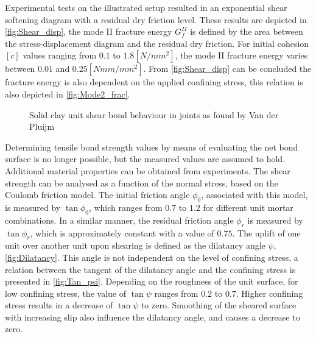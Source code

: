 Experimental tests on the illustrated setup resulted in an exponential shear softening diagram with a residual dry friction level. These results are depicted in \autoref{fig:Shear_disp}, the mode II fracture energy $G^{II}_{f}$ is defined by the area between the stress-displacement diagram and the residual dry friction. For initial cohesion $[c]$ values ranging from $0.1$ to $1.8 [N/mm^2]$, the mode II fracture energy varies between $0.01$ and $0.25 [Nmm/mm^2]$. From \autoref{fig:Shear_disp} can be concluded the fracture energy is also dependent on the applied confining stress, this relation is also depicted in \autoref{fig:Mode2_frac}.

\begin{figure}[!htb]
    \centering
     \hspace{3em}
    \caption{Solid clay unit shear bond behaviour in joints as found by Van der Pluijm \cite{pluijm1993, lourenco1996}}
    \label{fig:Shearbehave}
\end{figure}

Determining tensile bond strength values by means of evaluating the net bond surface is no longer possible, but the measured values are assumed to hold. Additional material properties can be obtained from experiments. The shear strength can be analysed as a function of the normal stress, based on the Coulomb friction model. The initial friction angle $\phi_0$, associated with this model, is measured by $\tan\phi_0$, which ranges from $0.7$ to $1.2$ for different unit mortar combinations. In a similar manner, the residual friction angle $\phi_r$ is measured by $\tan\phi_r$, which is approximately constant with a value of $0.75$. The uplift of one unit over another unit upon shearing is defined as the dilatancy angle $\psi$, \autoref{fig:Dilatancy}. This angle is not independent on the level of confining stress, a relation between the tangent of the dilatancy angle and the confining stress is presented in \autoref{fig:Tan_psi}. Depending on the roughness of the unit surface, for low confining stress, the value of $\tan\psi$ ranges from $0.2$ to $0.7$. Higher confining stress results in a decrease of $\tan\psi$ to zero. Smoothing of the sheared surface with increasing slip also influence the dilatancy angle, and causes a decrease to zero.

